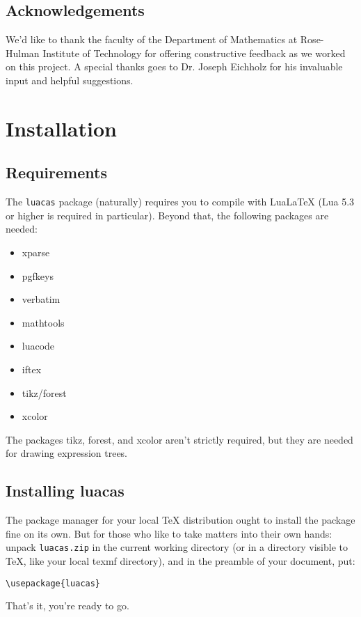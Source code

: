\documentclass{article}
\begin{document}
\subsection{Acknowledgements}

We'd like to thank the faculty of the Department of Mathematics at Rose-Hulman Institute of Technology for offering constructive feedback as we worked on this project. A special thanks goes to Dr. Joseph Eichholz for his invaluable input and helpful suggestions.

\section{Installation}

\subsection{Requirements}

The \texttt{luacas} package (naturally) requires you to compile with Lua\LaTeX{} (Lua 5.3 or higher is required in particular). Beyond that, the following packages are needed:
\begin{multicols}{2}
{\ttfamily
\begin{itemize}
    \item xparse
    \item pgfkeys
    \item verbatim
    \item mathtools
    \item luacode
    \item iftex
    \item tikz/forest
    \item xcolor
\end{itemize}}
\end{multicols}
The packages {\ttfamily tikz}, {\ttfamily forest}, and {\ttfamily xcolor} aren't strictly required, but they are needed for drawing expression trees.

\subsection{Installing {\ttfamily luacas}}
The package manager for your local TeX distribution ought to install the package fine on its own. But for those who like to take matters into their own hands: unpack \texttt{luacas.zip} in the current working directory (or in a directory visible to TeX, like your local texmf directory), and in the preamble of your document, put:
\begin{verbatim}
\usepackage{luacas}
\end{verbatim}
That's it, you're ready to go.
\end{document}
